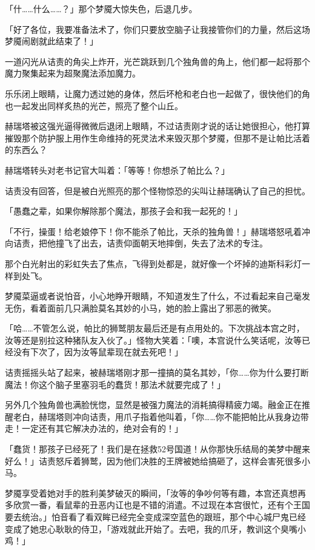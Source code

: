 「什……什么……？」那个梦魇大惊失色，后退几步。

「好了各位，我要准备法术了，你们只要放空脑子让我接管你们的力量，然后这场梦魇闹剧就此结束了！」

一道闪光从诘责的角尖上炸开，光芒跳跃到几个独角兽的角上，他们都一起将那个魔力聚集起来为超聚魔法添加魔力。

乐乐闭上眼睛，让魔力透过她的身体，然后坏枪和老白也一起做了，很快他们的角也一起发出同样炙热的光芒，照亮了整个山丘。

赫瑞塔被这强光逼得微微后退闭上眼睛，不过诘责刚才说的话让她很担心，他打算摧毁那个防护服上用作生命维持的死灵法术来毁灭那个梦魇，但那不是让帕比活着的东西么？

赫瑞塔转头对老书记官大叫着：「等等！你想杀了帕比么？」

诘责没有回答，但是被白光照亮的那个怪物惊恐的尖叫让赫瑞确认了自己的担忧。

「愚蠢之辈，如果你解除那个魔法，那孩子会和我一起死的！」

「不行，操蛋！给老娘停下！你不能杀了帕比，天杀的独角兽！」赫瑞塔怒吼着冲向诘责，把他撞飞了出去，诘责仰面朝天地摔倒，失去了法术的专注。

那个白光射出的彩虹失去了焦点，飞得到处都是，就好像一个坏掉的迪斯科彩灯一样到处飞。

梦魇菜逼或者说怕音，小心地睁开眼睛，不知道发生了什么，不过看起来自己毫发无伤，看着面前几只满脸莫名其妙的小马，她的脸上露出了邪恶的微笑。

「哈……不管怎么说，帕比的狮鹫朋友最后还是有点用处的。下次挑战本宫之时，汝等还是别拉这种猪队友入伙了。」怪物大笑着：「噢，本宫说什么笑话呢，汝等已经没有下次了，因为汝等鼠辈现在就去死吧！」

诘责摇摇头站了起来，被赫瑞塔刚才那一撞搞的莫名其妙，「你……你为什么要打断魔法！你这个脑子里塞羽毛的蠢货！那法术就要完成了！」

另外几个独角兽也满脸恍惚，显然是被强力魔法的消耗搞得精疲力竭。融金正在推醒老白，赫瑞塔则冲向诘责，用爪子指着他叫着，「你……你不能把帕比从我身边带走！一定还有其它解决办法的，绝对会有的！」

「蠢货！那孩子已经死了！我们是在拯救52号国道！从你那快乐结局的美梦中醒来好么！」诘责怒斥着狮鹫，因为他们决胜的王牌被她给搞砸了，这样会害死很多小马。

梦魇享受着她对手的胜利美梦破灭的瞬间，「汝等的争吵何等有趣，本宫还真想再多欣赏一番，看鼠辈的丑恶内讧也是不错的消遣。不过现在本宫很忙，还有个王国要去统治。」怕音看了看双眸已经完全变成深空蓝色的跟班，那个中心城尸鬼已经变成了她忠心耿耿的侍卫，「游戏就此开始了。去吧，我的爪牙，教训这个臭嘴小鸡！」

